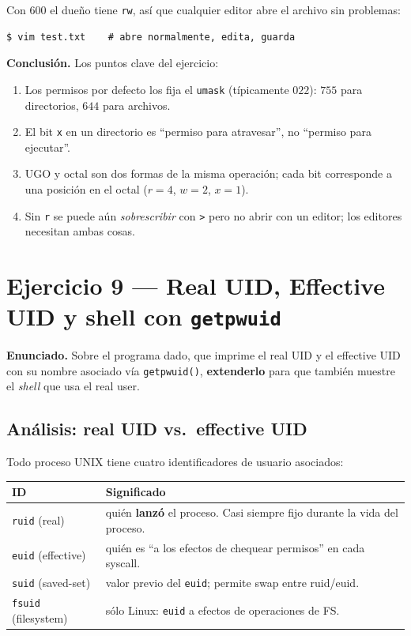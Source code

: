 \documentclass[11pt,a4paper]{article}
\begin{document}
Con $600$ el dueño tiene \texttt{rw}, así que cualquier editor abre el
archivo sin problemas:

\begin{lstlisting}[style=shellstyle]
$ vim test.txt    # abre normalmente, edita, guarda
\end{lstlisting}

\textbf{Conclusión.} Los puntos clave del ejercicio:

\begin{enumerate}[leftmargin=*]
    \item Los permisos por defecto los fija el \texttt{umask}
        (típicamente $022$): $755$ para directorios, $644$ para
        archivos.
    \item El bit \texttt{x} en un directorio es ``permiso para
        atravesar'', no ``permiso para ejecutar''.
    \item UGO y octal son dos formas de la misma operación; cada bit
        corresponde a una posición en el octal ($r=4$, $w=2$, $x=1$).
    \item Sin \texttt{r} se puede aún \emph{sobrescribir} con \texttt{>}
        pero no abrir con un editor; los editores necesitan ambas
        cosas.
\end{enumerate}

\section{Ejercicio 9 --- Real UID, Effective UID y shell con \texttt{getpwuid}}

\textbf{Enunciado.} Sobre el programa dado, que imprime el real UID y
el effective UID con su nombre asociado vía \texttt{getpwuid()},
\textbf{extenderlo} para que también muestre el \emph{shell} que usa
el real user.

\subsection*{Análisis: real UID vs.\ effective UID}

Todo proceso UNIX tiene cuatro identificadores de usuario asociados:

\begin{center}
\small
\begin{tabular}{@{}lp{9cm}@{}}
\toprule
ID & Significado \\
\midrule
\texttt{ruid} (real)            & quién \textbf{lanzó} el proceso. Casi siempre fijo durante la vida del proceso. \\
\texttt{euid} (effective)       & quién es ``a los efectos de chequear permisos'' en cada syscall. \\
\texttt{suid} (saved-set)       & valor previo del \texttt{euid}; permite swap entre ruid/euid. \\
\texttt{fsuid} (filesystem)     & sólo Linux: \texttt{euid} a efectos de operaciones de FS. \\
\bottomrule
\end{tabular}
\end{center}
\end{document}
